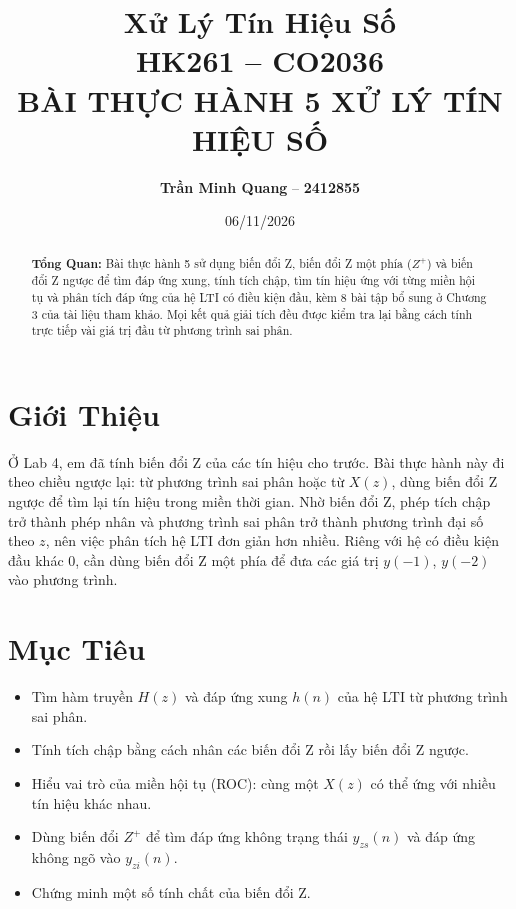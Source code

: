 \documentclass[12pt,a4paper]{article}
\title{
    \vspace{-1.5cm}
    \large\textbf{Xử Lý Tín Hiệu Số} \\
    \normalsize HK261 \quad -- \quad CO2036 \\[1em]
    \Large\textbf{BÀI THỰC HÀNH 5 XỬ LÝ TÍN HIỆU SỐ}
}
\author{
    \textbf{Trần Minh Quang} -- \textbf{2412855}
}
\date{06/11/2026}
\begin{document}
\maketitle

\begin{abstract}
\noindent\textbf{Tổng Quan:} Bài thực hành 5 sử dụng biến đổi Z, biến đổi Z một phía ($Z^+$) và biến đổi Z ngược để tìm đáp ứng xung, tính tích chập, tìm tín hiệu ứng với từng miền hội tụ và phân tích đáp ứng của hệ LTI có điều kiện đầu, kèm 8 bài tập bổ sung ở Chương 3 của tài liệu tham khảo. Mọi kết quả giải tích đều được kiểm tra lại bằng cách tính trực tiếp vài giá trị đầu từ phương trình sai phân.
\end{abstract}

\vspace{0.5cm}

\section{Giới Thiệu}
Ở Lab 4, em đã tính biến đổi Z của các tín hiệu cho trước. Bài thực hành này đi theo chiều ngược lại: từ phương trình sai phân hoặc từ $X(z)$, dùng biến đổi Z ngược để tìm lại tín hiệu trong miền thời gian. Nhờ biến đổi Z, phép tích chập trở thành phép nhân và phương trình sai phân trở thành phương trình đại số theo $z$, nên việc phân tích hệ LTI đơn giản hơn nhiều. Riêng với hệ có điều kiện đầu khác 0, cần dùng biến đổi Z một phía để đưa các giá trị $y(-1)$, $y(-2)$ vào phương trình.

\section{Mục Tiêu}
\begin{itemize}
    \item Tìm hàm truyền $H(z)$ và đáp ứng xung $h(n)$ của hệ LTI từ phương trình sai phân.
    \item Tính tích chập bằng cách nhân các biến đổi Z rồi lấy biến đổi Z ngược.
    \item Hiểu vai trò của miền hội tụ (ROC): cùng một $X(z)$ có thể ứng với nhiều tín hiệu khác nhau.
    \item Dùng biến đổi $Z^+$ để tìm đáp ứng không trạng thái $y_{zs}(n)$ và đáp ứng không ngõ vào $y_{zi}(n)$.
    \item Chứng minh một số tính chất của biến đổi Z.
\end{itemize}
\end{document}
